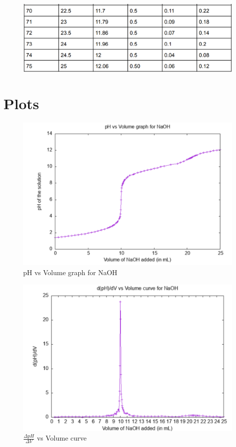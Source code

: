 \documentclass[12pt]{article}
\begin{document}
	\begin{figure}[H]
		\centering
		\includegraphics[scale=0.7]{table7}
	\end{figure}

	\section{Plots}
	
	\begin{figure}[H]
		\centering
		\includegraphics[scale=0.7]{plot1}
		\caption{pH vs Volume graph for NaOH }
	\end{figure}

	\begin{figure}[H]
		\centering
		\includegraphics[scale=0.7]{plot2}
		\caption{$\frac{\Delta pH}{\Delta V}$ vs Volume curve}
	\end{figure}
	
\end{document}
